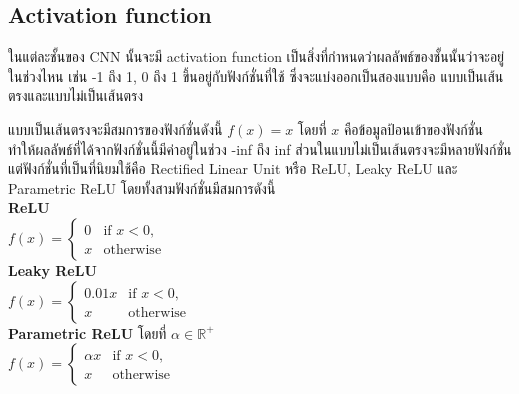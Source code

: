 \subsection*{Activation function}
ในแต่ละชั้นของ CNN นั้นจะมี activation function เป็นสิ่งที่กำหนดว่าผลลัพธ์ของชั้นนั้นว่าจะอยู่ในช่วงไหน 
เช่น -1 ถึง 1, 0 ถึง 1 ขึ้นอยู่กับฟังก์ชั่นที่ใช้ ซึ่งจะแบ่งออกเป็นสองแบบคือ แบบเป็นเส้นตรงและแบบไม่เป็นเส้นตรง

แบบเป็นเส้นตรงจะมีสมการของฟังก์ชั่นดังนี้ $ f(x) = x $ โดยที่ $x$ คือข้อมูลป้อนเข้าของฟังก์ชั่น ทำให้ผลลัพธ์ที่ได้จากฟังก์ชั่นนี้มีค่าอยู่ในช่วง -inf ถึง inf
ส่วนในแบบไม่เป็นเส้นตรงจะมีหลายฟังก์ชั่น แต่ฟังก์ชั่นที่เป็นที่นิยมใช้คือ Rectified Linear Unit หรือ ReLU, Leaky ReLU และ Parametric ReLU โดยทั้งสามฟังก์ชั่นมีสมการดังนี้\\
\textbf{ReLU}\\
$ f(x) =
\begin{cases}
	0 & \text{if } x < 0,\\
	x & \text{otherwise}
\end{cases}
$\\
\textbf{Leaky ReLU}\\
$ f(x) =
\begin{cases}
	0.01x & \text{if } x < 0,\\
	x & \text{otherwise}
\end{cases}
$\\
\textbf{Parametric ReLU} โดยที่ $\alpha\in\mathbb{R^+}$\\
$ f(x) =
\begin{cases}
	\alpha x & \text{if } x < 0,\\
	x & \text{otherwise}
\end{cases}
$
